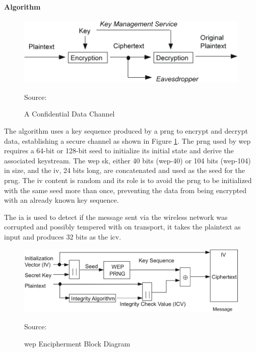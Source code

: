 \paragraph{Algorithm}

\begin{figure}[h]
    \centering
    \includegraphics[width=\linewidth]{contents/background-in-wireless-networks/protected-network-standards/wep/algorithm/a-confidential-data-channel.png}
    \caption{A Confidential Data Channel}
    {Source: \cite{ieee_80211_2020}}
    \label{figure:ieee80211_figure43}
\end{figure}

The algorithm \cite{ieee_80211_2020} uses a key sequence produced by a \gls{prng} to encrypt and decrypt data, establishing a secure channel as shown in Figure \ref{figure:ieee80211_figure43}. The \gls{prng} used by \gls{wep} requires a 64-bit or 128-bit seed to initialize its initial state and derive the associated keystream. The \gls{wep} \gls{sk}, either 40 bits (\gls{wep}-40) or 104 bits (\gls{wep}-104) in size, and the \gls{iv}, 24 bits long, are concatenated and used as the seed for the \gls{prng}. The \gls{iv} content is random and its role is to avoid the \gls{prng} to be initialized with the same seed more than once, preventing the data from being encrypted with an already known key sequence.

The \gls{ia} is used to detect if the message sent via the wireless network was corrupted and possibly tempered with on transport, it takes the plaintext as input and produces 32 bits as the \gls{icv}.

\begin{figure}[h]
    \centering
    \includegraphics[width=\linewidth]{contents/background-in-wireless-networks/protected-network-standards/wep/algorithm/wep-encipherment-block-diagram.png}
    \caption{\gls{wep} Encipherment Block Diagram}
    {Source: \cite{ieee_80211_2020}}
    \label{figure:ieee80211_figure44}
\end{figure}

